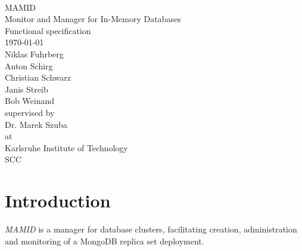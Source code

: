 \documentclass[a4paper, 11pt]{article}
\let\oldsection\section
\renewcommand\section{\clearpage\oldsection}
\begin{document}
\newcommand{\refsymbol}[0]{\scalebox{0.5}{$\nearrow$}}
\let\oldref\ref
\renewcommand{\ref}[1]{\refsymbol\oldref{#1}}
\let\oldgls\gls
\renewcommand{\gls}[1]{\refsymbol\oldgls{#1}}
\let\oldGls\Gls
\renewcommand{\Gls}[1]{\refsymbol\oldGls{#1}}
\let\oldglspl\glspl
\renewcommand{\glspl}[1]{\refsymbol\oldglspl{#1}}
\let\oldGlspl\Glspl
\renewcommand{\Glspl}[1]{\refsymbol\oldGlspl{#1}}
\let\oldglslink\glslink
\renewcommand{\glslink}[2]{\refsymbol\oldglslink{#1}{#2}}
\let\oldhyperref\hyperref
\renewcommand{\hyperref}[2][notActuallyOptional]{\refsymbol\oldhyperref[#1]{#2}}
\let\oldautoref\autoref
\renewcommand{\autoref}[1]{\refsymbol\oldautoref{#1}}

\newcommand{\abbildung}[1]{\autoref{fig:#1}}
\newcommand{\mamid}{\textit{MAMID}\xspace}



\begin{titlepage}
\makeatletter
\begin{center}
~\\[4em]
{\Huge MAMID}\\[.8em]\huge{Monitor and Manager for In-Memory Databases}\\[2em]
{\huge Functional specification}\\[1em]
{\large\today}\\[2.5em]
{\LARGE
Niklas Fuhrberg\\
Anton Schirg\\
Christian Schwarz\\
Janis Streib\\
Bob Weinand\\[3em]}
supervised by\\[2em]
{\Large
Dr. Marek Szuba\\[1em]}
at\\[1em]
{\Large
Karlsruhe Institute of Technology\\
SCC}

\end{center}
\makeatother
\end{titlepage}
\newpage
\tableofcontents
\newpage

\section{Introduction}
\mamid is a manager for database \glspl{cluster}, facilitating creation, administration and monitoring of a \gls{MongoDB} \gls{replica set} deployment.
\end{document}
